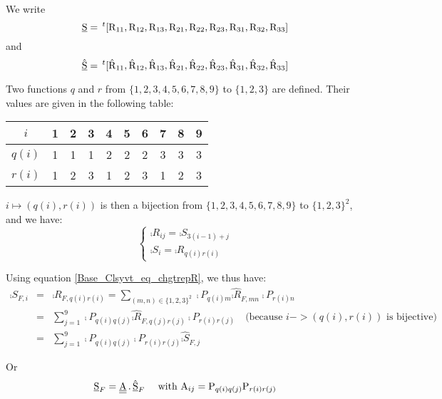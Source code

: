 We write
\begin{equation}
\underline{\textrm{S}}=\,^t[\textrm{R}_{11},\textrm{R}_{12},\textrm{R}_{13},
\textrm{R}_{21},\textrm{R}_{22},\textrm{R}_{23},
\textrm{R}_{31},\textrm{R}_{32},\textrm{R}_{33}]
\end{equation}
and
\begin{equation}
\hat{\underline{\textrm{S}}}=\,^t[\hat{\textrm{R}}_{11},\hat{\textrm{R}}_{12},\hat{\textrm{R}}_{13},
\hat{\textrm{R}}_{21},\hat{\textrm{R}}_{22},\hat{\textrm{R}}_{23},
\hat{\textrm{R}}_{31},\hat{\textrm{R}}_{32},\hat{\textrm{R}}_{33}]
\end{equation}

Two functions $q$ and $r$ from $\{1,2,3,4,5,6,7,8,9\}$ to
$\{1,2,3\}$ are defined. Their values are given in the following table:
\begin{center}
\begin{tabular}{|c|c|c|c|c|c|c|c|c|c|}
\hline
$i$&1&2&3&4&5&6&7&8&9\\
\hline
$q(i)$&1&1&1&2&2&2&3&3&3\\
\hline
$r(i)$&1&2&3&1&2&3&1&2&3\\
\hline
\end{tabular}
\end{center}
$i\longmapsto (q(i),r(i))$ is then a bijection from $\{1,2,3,4,5,6,7,8,9\}$
to $\{1,2,3\}^2$, and we have:
\begin{equation}
\left\{\begin{array}{l}
\comp{R}_{ij}=\comp{S}_{3(i-1)+j}\\
\comp{S}_i=\comp{R}_{q(i)r(i)}
\end{array}\right.
\end{equation}

Using equation \ref{Base_Clsyvt_eq_chgtrepR}, we thus have:
\begin{eqnarray}
\comp{S}_{F,i} & = & \comp{R}_{F,q(i)r(i)} =
\sum_{(m,n)\in\{1,2,3\}^2}\comp{P}_{q(i)m}\hat{\comp{R}}_{F,mn}\comp{P}_{r(i)n}\nonumber\\
&=&\sum_{j=1}^9\comp{P}_{q(i)q(j)}\hat{\comp{R}}_{F,q(j)r(j)}\comp{P}_{r(i)r(j)}
\quad\text{(because $i->(q(i),r(i))$ is bijective)}\nonumber\\
&=&\sum_{j=1}^9\comp{P}_{q(i)q(j)}\comp{P}_{r(i)r(j)}\hat{\comp{S}}_{F,j}
\end{eqnarray}

Or
\begin{equation}
\underline{\textrm{S}}_{F}=\underline{\underline{\textrm{A}}}\,.\,\hat{\underline{\textrm{S}}}_F\quad\text{ with }
\textrm{A}_{ij}=\textrm{P}_{q(i)q(j)}\textrm{P}_{r(i)r(j)}
\end{equation}

